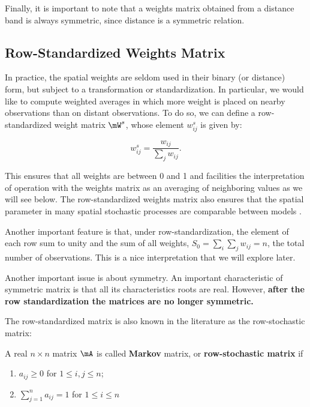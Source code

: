 \documentclass[english,12pt]{book}\usepackage[]{graphicx}\usepackage[]{xcolor}
\begin{document}
Finally, it is important to note that a weights matrix obtained from a distance band is always symmetric, since distance is a symmetric relation. 

\subsection{Row-Standardized Weights Matrix}

In practice, the spatial weights are seldom used in their binary (or distance) form, but subject to a transformation or standardization. In particular, we would like to compute weighted averages in which more weight is placed on nearby observations than on distant observations. To do so, we can define a row-standardized weight matrix $\mW^s$, whose element $w_{ij}^s$ is given by:

\begin{equation*}
w_{ij}^s = \frac{w_{ij}}{\sum_j w_{ij}}.
\end{equation*}

This ensures that all weights are between 0 and 1 and facilities the interpretation of operation with the weights matrix as an averaging of neighboring values as we will see below. The row-standardized weights matrix also ensures that the spatial parameter in many spatial stochastic processes are comparable between models  \citep{AnselinBera1998}.

Another important feature is that, under row-standardization, the element of each row sum to unity and the sum of all weights, $S_0 = \sum_i\sum_j w_{ij} = n$, the total number of observations. This is a nice interpretation that we will explore later.

Another important issue is about symmetry. An important characteristic of symmetric matrix is that all its characteristics roots are real. However, \textbf{after the row standardization the matrices are no longer symmetric.} 

The row-standardized matrix is also known in the literature as the row-stochastic matrix:


\begin{definition}
	A real $n\times n$ matrix $\mA$ is called \textbf{Markov} matrix, or \textbf{row-stochastic matrix} if 
		\begin{enumerate}
			\item $a_{ij} \geq 0$ for $1\leq i, j \leq n$;
			\item $\sum_{j=1}^n a_{ij} = 1$ for $1\leq i \leq n$
		\end{enumerate}
\end{definition}
\end{document}
